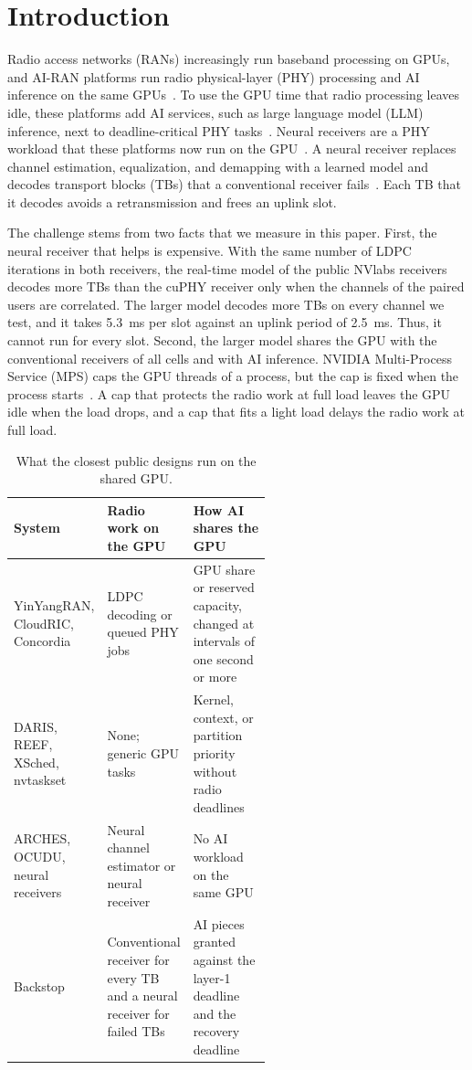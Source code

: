 \documentclass[acmsmall,screen,review,anonymous]{acmart}
\newcommand{\sys}{Backstop\xspace}
\begin{document}
\section{Introduction}

Radio access networks (RANs) increasingly run baseband processing on GPUs, and AI-RAN platforms run radio
physical-layer (PHY) processing and AI inference on the same GPUs~\cite{aerial,yinyangran,interplay,distributedairan}.
To use the GPU time that radio processing leaves idle, these platforms add AI services, such as large
language model (LLM) inference, next to deadline-critical PHY tasks~\cite{caora,haf}. Neural receivers are a
PHY workload that these platforms now run on the GPU~\cite{aerial,nrxrt}. A neural receiver replaces channel estimation,
equalization, and demapping with a learned model and decodes transport blocks (TBs) that a conventional
receiver fails~\cite{deeprx,nrx5g,nrxrt}. Each TB that it decodes avoids a retransmission and frees an uplink
slot.

The challenge stems from two facts that we measure in this paper. First, the neural receiver that helps
is expensive. With the same number of LDPC iterations in both receivers, the real-time model of the public
NVlabs receivers~\cite{nrxrt,neuralrxsw} decodes more TBs than the cuPHY receiver only when the channels of
the paired users are correlated. The larger model decodes more TBs on every channel we test, and it takes
5.3~ms per slot against an uplink period of 2.5~ms. Thus, it cannot run for every slot. Second, the larger
model shares the GPU with the conventional receivers of all cells and with AI inference. NVIDIA
Multi-Process Service (MPS) caps the GPU threads of a process, but the cap is fixed when the process
starts~\cite{nvidiampS}. A cap that protects the radio work at full load leaves the GPU idle when the load
drops, and a cap that fits a light load delays the radio work at full load.

\begin{table}[t]
\caption{What the closest public designs run on the shared GPU.}
\label{tab:closest}
\footnotesize
\begin{tabularx}{\linewidth}{@{}>{\raggedright\arraybackslash}p{0.25\linewidth}>{\raggedright\arraybackslash}p{0.31\linewidth}>{\raggedright\arraybackslash}X@{}}
\toprule
System & Radio work on the GPU & How AI shares the GPU \\
\midrule
YinYangRAN, CloudRIC, Concordia & LDPC decoding or queued PHY jobs & GPU share or reserved capacity, changed at intervals of one second or more \\
DARIS, REEF, XSched, nvtaskset & None; generic GPU tasks & Kernel, context, or partition priority without radio deadlines \\
ARCHES, OCUDU, neural receivers & Neural channel estimator or neural receiver & No AI workload on the same GPU \\
\sys & Conventional receiver for every TB and a neural receiver for failed TBs & AI pieces granted against the layer-1 deadline and the recovery deadline \\
\bottomrule
\end{tabularx}
\end{table}
\end{document}
